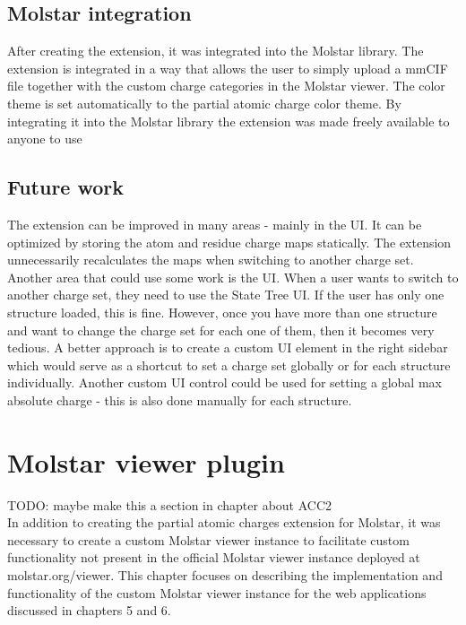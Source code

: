\documentclass[
  digital,     %
  oneside,     %
  nosansbold,  %
  nocolorbold, %
  lof,         %
  lot,         %
]{fithesis4}
\begin{document}
\section{Molstar integration}

After creating the extension, it was integrated into the Molstar library. The extension is integrated in a way that allows the user to simply upload a mmCIF file together with the custom charge categories in the Molstar viewer. The color theme is set automatically to the partial atomic charge color theme. By integrating it into the Molstar library the extension was made freely available to anyone to use

\section{Future work}

The extension can be improved in many areas - mainly in the UI. It can be optimized by storing the atom and residue charge maps statically. The extension unnecessarily recalculates the maps when switching to another charge set. Another area that could use some work is the UI. When a user wants to switch to another charge set, they need to use the State Tree UI. If the user has only one structure loaded, this is fine. However, once you have more than one structure and want to change the charge set for each one of them, then it becomes very tedious. A better approach is to create a custom UI element in the right sidebar which would serve as a shortcut to set a charge set globally or for each structure individually. Another custom UI control could be used for setting a global max absolute charge - this is also done manually for each structure.

\chapter{Molstar viewer plugin}

TODO: maybe make this a section in chapter about ACC2 \\

In addition to creating the partial atomic charges extension for Molstar, it was necessary to create a custom Molstar viewer instance to facilitate custom functionality not present in the official Molstar viewer instance deployed at molstar.org/viewer. This chapter focuses on describing the implementation and functionality of the custom Molstar viewer instance for the web applications discussed in chapters 5 and 6.
\end{document}
